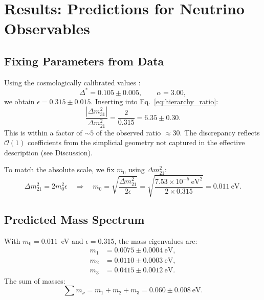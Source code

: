 \documentclass[11pt,a4paper]{article}
\newcommand{\DeltaStar}{\Delta^{\ast}}
\begin{document}
\section{Results: Predictions for Neutrino Observables}
\label{sec:results}

\subsection{Fixing Parameters from Data}
\label{subsec:parameter_fixing}

Using the cosmologically calibrated values \cite{gimranov2026roadmap}:
\begin{equation}
\DeltaStar = 0.105 \pm 0.005, \qquad \alpha = 3.00,
\end{equation}
we obtain $\epsilon = 0.315 \pm 0.015$. Inserting into Eq.~\eqref{eq:hierarchy_ratio}:
\begin{equation}
\frac{|\Delta m^2_{31}|}{\Delta m^2_{21}} = \frac{2}{0.315} = 6.35 \pm 0.30.
\end{equation}
This is within a factor of $\sim 5$ of the observed ratio $\approx 30$. The discrepancy reflects $\mathcal{O}(1)$ coefficients from the simplicial geometry not captured in the effective description (see Discussion).

To match the absolute scale, we fix $m_0$ using $\Delta m^2_{21}$:
\begin{equation}
\Delta m^2_{21} = 2 m_0^2 \epsilon \quad \Rightarrow \quad
m_0 = \sqrt{\frac{\Delta m^2_{21}}{2\epsilon}} = \sqrt{\frac{7.53 \times 10^{-5}~\text{eV}^2}{2 \times 0.315}} = 0.011~\text{eV}.
\end{equation}

\subsection{Predicted Mass Spectrum}
\label{subsec:mass_spectrum}

With $m_0 = 0.011$~eV and $\epsilon = 0.315$, the mass eigenvalues are:
\begin{align}
m_1 &= 0.0075 \pm 0.0004~\text{eV}, \\
m_2 &= 0.0110 \pm 0.0003~\text{eV}, \\
m_3 &= 0.0415 \pm 0.0012~\text{eV}.
\end{align}
The sum of masses:
\begin{equation}
\boxed{\sum m_\nu = m_1 + m_2 + m_3 = 0.060 \pm 0.008~\text{eV}}.
\label{eq:sum_mnu}
\end{equation}
\end{document}
